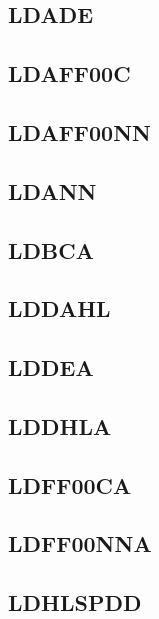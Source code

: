 \documentclass[a4paper]{article}
\begin{document}
\subsection{LDADE}
\sailfclLDADEdecode
\sailfclLDADEassembly
\sailfclLDADEexecute
\subsection{LDAFF00C}
\sailfclLDAFFZeroZeroCdecode
\sailfclLDAFFZeroZeroCassembly
\sailfclLDAFFZeroZeroCexecute
\subsection{LDAFF00NN}
\sailfclLDAFFZeroZeroNNimmdecodeOneSix
\sailfclLDAFFZeroZeroNNassembly
\sailfclLDAFFZeroZeroNNexecute
\subsection{LDANN}
\sailfclLDANNmakeLsbimmdecodeTwoFour
\sailfclLDANNassembly
\sailfclLDANNexecute
\subsection{LDBCA}
\sailfclLDBCAdecode
\sailfclLDBCAassembly
\sailfclLDBCAexecute
\subsection{LDDAHL}
\sailfclLDDAHLdecode
\sailfclLDDAHLassembly
\sailfclLDDAHLexecute
\subsection{LDDEA}
\sailfclLDDEAdecode
\sailfclLDDEAassembly
\sailfclLDDEAexecute
\subsection{LDDHLA}
\sailfclLDDHLAdecode
\sailfclLDDHLAassembly
\sailfclLDDHLAexecute
\subsection{LDFF00CA}
\sailfclLDFFZeroZeroCAdecode
\sailfclLDFFZeroZeroCAassembly
\sailfclLDFFZeroZeroCAexecute
\subsection{LDFF00NNA}
\sailfclLDFFZeroZeroNNAimmdecodeOneSix
\sailfclLDFFZeroZeroNNAassembly
\sailfclLDFFZeroZeroNNAexecute
\subsection{LDHLSPDD}
\sailfclLDHLSPDDddecodeOneSix
\sailfclLDHLSPDDassembly
\sailfclLDHLSPDDexecute
\end{document}
